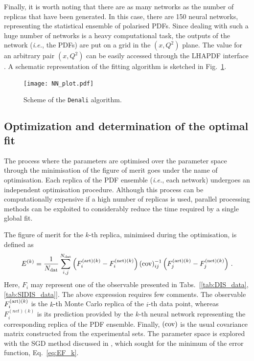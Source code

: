 Finally, it is worth noting that there are as many networks as the number of replicas that have been generated. In this case, there are 150 neural networks, representing the statistical ensemble of polarised PDFs. Since dealing with such a huge number of networks is a heavy computational task, the outputs of the network (\textit{i.e.}, the PDFs) are put on a grid in the $(x,Q^2)$ plane. The value for an arbitrary pair $(x,Q^2)$ can be easily accessed through the LHAPDF interface \cite{Buckley:2014ana}. A schematic representation of the fitting algorithm is sketched in Fig.~\ref{fig:NN_plot}.
\begin{figure}[t]
  \centering
  \texttt{[image: NN\_plot.pdf]} 
  \caption{\small{Scheme of the \texttt{Denali} algorithm.}}
  \label{fig:NN_plot}
\end{figure}

\subsection*{Optimization and determination of the optimal fit}
The process where the parameters are optimised over the parameter space through the minimisation of the figure of merit goes under the name of optimisation. Each replica of the PDF ensemble (\textit{i.e.}, each network) undergoes an independent optimisation procedure. Although this process can be computationally expensive if a high number of replicas is used, parallel processing methods can be exploited to considerably reduce the time required by a single global fit.%

The figure of merit for the $k$-th replica, minimised during the optimisation, is defined as
\begin{equation}
  E^{(k)} = \frac{1}{N_{\textrm{dat}}} \sum_{i,j}^{N_{\textrm{dat}}} \left( F_{i}^{\textrm{(art)}(k)} - F_{i}^{\textrm{(net)}(k)} \right) (\textrm{cov})^{-1}_{ij} \left( F_{j}^{\textrm{(art)}(k)} - F_{j}^{\textrm{(net)}(k)} \right) \,.
  \label{eq:EF_k}
\end{equation}
Here, $F_i$ may represent one of the observable presented in Tabs.~[\ref{tab:DIS_data},\ref{tab:SIDIS_data}]. 
The above expression requires few comments. The observable $F_{i}^{\textrm{(art)}(k)}$ is the $k$-th Monte Carlo replica of the $i$-th data point, whereas $F_{i}^{(net)(k)}$ is its prediction provided by the $k$-th neural network representing the corresponding replica of the PDF ensemble. Finally, $\textrm{(cov)}$ is the usual covariance matrix constructed from the experimental sets. The parameter space is explored with the SGD method discussed in , which sought for the minimum of the error function, Eq.~\eqref{eq:EF_k}.%

